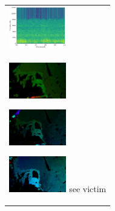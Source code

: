 \begin{figure}[htbp]
\begin{tabular}{l}
\begin{minipage}{0.165\hsize}
\begin{center}
        \end{center}
      \end{minipage}
      \begin{minipage}{0.165\hsize}
        \begin{center}
          \includegraphics[clip, width=2.5cm]{./Figures/sound_seevictim.eps}
        \end{center}
      \end{minipage}
\\  %
      \begin{minipage}{0.165\hsize}
        \begin{center}
          \includegraphics[clip, width=2.5cm]{./Figures/optic_seevictim1.eps}
          \hspace{0.3cm} { }
        \end{center}
      \end{minipage}
      \begin{minipage}{0.165\hsize}
        \begin{center}
          \includegraphics[clip, width=2.5cm]{./Figures/optic_seevictim2.eps}
          \hspace{0.0cm} { }
        \end{center}
      \end{minipage}
      \begin{minipage}{0.165\hsize}
        \begin{center}
          \includegraphics[clip, width=2.5cm]{./Figures/optic_seevictim3.eps}
          \hspace{2.0cm} {see victim}
        \end{center}
      \end{minipage}

\end{tabular}
\end{figure}
